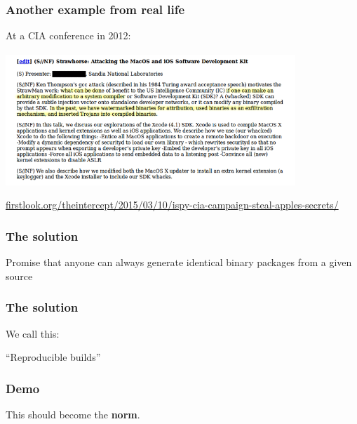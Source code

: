 \documentclass[14pt,aspectratio=169]{beamer}
\begin{document}
\begin{frame}[fragile]
 \frametitle{Another example from real life}

 At a CIA conference in 2012:
 \begin{center}
  \includegraphics[width=0.82\textwidth]{images/strawhorse.png}

  {\footnotesize
  \url{firstlook.org/theintercept/2015/03/10/ispy-cia-campaign-steal-apples-secrets/}
  }
 \end{center}
\end{frame}


\begin{frame}
 \frametitle{The solution}

 \begin{center}
 \Large{
 Promise that anyone can always generate
 identical binary packages
 from a given source}
\end{center}
\end{frame}


\begin{frame}
 \frametitle{The solution}

 \begin{center}
 We call this:

 \Huge{ “Reproducible builds” }
 \end{center}
\end{frame}

\begin{frame}
 \frametitle{Demo}
%
%
\end{frame}

\begin{frame}[plain]
\begin{center}
 \Huge{This should become the \textbf{norm}.}

\end{center}
\end{frame}
\end{document}
